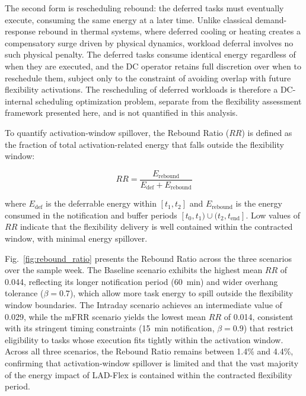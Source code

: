 \documentclass[preprint,12pt]{elsarticle}
\begin{document}
The second form is rescheduling rebound: the deferred tasks must eventually execute, consuming the same energy at a later time. Unlike classical demand-response rebound in thermal systems, where deferred cooling or heating creates a compensatory surge driven by physical dynamics, workload deferral involves no such physical penalty. The deferred tasks consume identical energy regardless of when they are executed, and the DC operator retains full discretion over when to reschedule them, subject only to the constraint of avoiding overlap with future flexibility activations. The rescheduling of deferred workloads is therefore a DC-internal scheduling optimization problem, separate from the flexibility assessment framework presented here, and is not quantified in this analysis.

To quantify activation-window spillover, the Rebound Ratio ($RR$) is defined as the fraction of total activation-related energy that falls outside the flexibility window:

\begin{equation}
    RR = \frac{E_{\text{rebound}}}{E_{\text{def}} + E_{\text{rebound}}}
    \label{eq:rebound_ratio}
\end{equation}

\noindent where $E_{\text{def}}$ is the deferrable energy within $[t_1, t_2]$ and $E_{\text{rebound}}$ is the energy consumed in the notification and buffer periods $[t_0, t_1) \cup (t_2, t_{\text{end}}]$. Low values of $RR$ indicate that the flexibility delivery is well contained within the contracted window, with minimal energy spillover.

Fig.~\ref{fig:rebound_ratio} presents the Rebound Ratio across the three scenarios over the sample week. The Baseline scenario exhibits the highest mean $RR$ of 0.044, reflecting its longer notification period (60~min) and wider overhang tolerance ($\beta = 0.7$), which allow more task energy to spill outside the flexibility window boundaries. The Intraday scenario achieves an intermediate value of 0.029, while the mFRR scenario yields the lowest mean $RR$ of 0.014, consistent with its stringent timing constraints (15~min notification, $\beta = 0.9$) that restrict eligibility to tasks whose execution fits tightly within the activation window. Across all three scenarios, the Rebound Ratio remains between 1.4\% and 4.4\%, confirming that activation-window spillover is limited and that the vast majority of the energy impact of LAD-Flex is contained within the contracted flexibility period.
\end{document}
